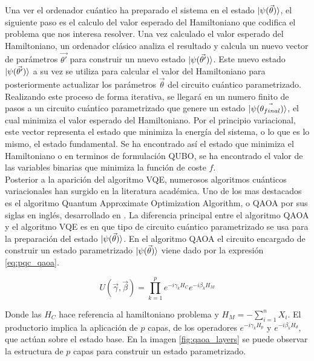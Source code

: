 Una ver el ordenador cuántico ha preparado el sistema en el estado $\ket{\psi(\Vec{\theta})}$, el siguiente paso es el calculo del valor esperado del Hamiltoniano que codifica el problema que nos interesa resolver. Una vez calculado el valor esperado del Hamiltoniano, un ordenador clásico analiza el resultado y calcula un nuevo vector de parámetros $\Vec{\theta'}$ para construir un nuevo estado $\ket{\psi(\Vec{\theta'})}$. Este nuevo estado $\ket{\psi(\Vec{\theta'})}$ a su vez se utiliza para calcular el valor del Hamiltoniano para posteriormente actualizar los parámetros $\Vec{\theta}$ del circuito cuántico parametrizado. \\

Realizando este proceso de forma iterativa, se llegará en un numero finito de pasos a un circuito cuántico parametrizado que genere un estado $\ket{\psi(\Vec{\theta_{final}})}$, el cual minimiza el valor esperado del Hamiltoniano. Por el principio variacional, este vector representa el estado que minimiza la energía del sistema, o lo que es lo mismo, el estado fundamental. Se ha encontrado así el estado que minimiza el Hamiltoniano o en terminos de formulación QUBO, se ha encontrado el valor de las variables binarias que minimiza la función de coste $f$. \\

Posterior a la aparición del algoritmo VQE, numerosos algoritmos cuánticos variacionales han surgido en la literatura académica. Uno de los mas destacados es el algoritmo Quantum Approximate Optimization Algorithm, o QAOA  por sus siglas en inglés, desarrollado en \citep{farhi}. La diferencia principal entre el algoritmo QAOA y el algoritmo VQE es en que tipo de circuito cuántico parametrizado se usa para la preparación del estado  $\ket{\psi(\Vec{\theta})}$. En el algoritmo QAOA el circuito encargado de construir un estado parametrizado $\ket{\psi(\Vec{\theta})}$ viene dado por la expresión \ref{eq:pqc_qaoa}.


\begin{equation}
    U(\vec \gamma,\vec \beta)=\prod_{k=1}^p e^{-i \gamma_k H_C} e^{- i \beta_k H_M}
    \label{eq:pqc_qaoa}
\end{equation}

\newpage

Donde las $H_C$ hace referencia al hamiltoniano problema y $H_M=-\sum_{i=1}^n X_i$. El productorio implica la aplicación de $p$ capas, de los operadores $e^{-i \gamma_k H_p}$ y $e^{- i \beta_k H_d}$, que actúan sobre el estado base. En la imagen \ref{fig:qaoa_layers} se puede observar la estructura de $p$ capas para construir un estado parametrizado.

